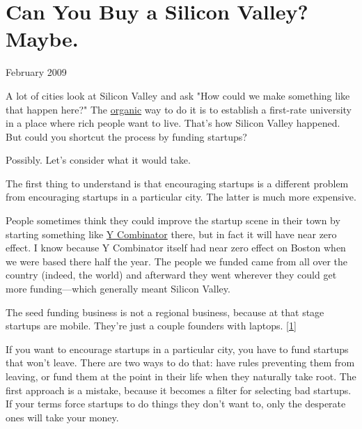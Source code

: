 \chapter{Can You Buy a Silicon Valley? Maybe.}


            
              
                

February 2009

A lot of cities look at Silicon
                  Valley and ask "How could we make something like that happen
                  here?" The \href{http://www.paulgraham.com/siliconvalley.html}{organic} way to do
                  it is to establish a first-rate university in a place where
                  rich people want to live. That's how Silicon Valley happened.
                  But could you shortcut the process by funding startups?

Possibly.
                  Let's consider what it would take.

The first thing
                  to understand is that encouraging startups is a different
                  problem from encouraging startups in a particular city. The
                  latter is much more expensive.

People sometimes
                  think they could improve the startup scene in their town by
                  starting something like
                  \href{http://ycombinator.com}{Y Combinator} there, but
                  in fact it will have near zero effect. I know because Y
                  Combinator itself had near zero effect on Boston when we were
                  based there half the year. The people we funded came from all
                  over the country (indeed, the world) and afterward they went
                  wherever they could get more funding---which generally
                  meant Silicon Valley.

The seed funding business is
                  not a regional business, because at that stage startups are
                  mobile. They're just a couple founders with laptops.
                  [\href{\#f1n}{1}]

If you want to encourage startups in a particular
                  city, you have to fund startups that won't leave. There are
                  two ways to do that: have rules preventing them from leaving,
                  or fund them at the point in their life when they naturally
                  take root. The first approach is a mistake, because it becomes
                  a filter for selecting bad startups. If your terms force
                  startups to do things they don't want to, only the desperate
                  ones will take your money.

